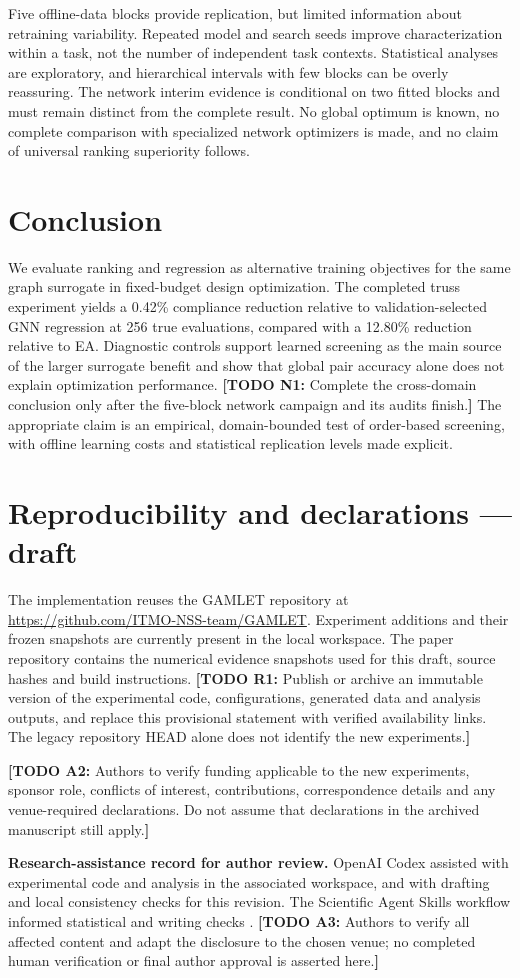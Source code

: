 \documentclass[11pt,a4paper]{article}
\newcommand{\todo}[2]{\textcolor{red!65!black}{\textbf{[TODO #1:} #2\textbf{]}}}
\begin{document}
Five offline-data blocks provide replication, but limited information about retraining variability. Repeated model and search seeds improve characterization within a task, not the number of independent task contexts. Statistical analyses are exploratory, and hierarchical intervals with few blocks can be overly reassuring. The network interim evidence is conditional on two fitted blocks and must remain distinct from the complete result. No global optimum is known, no complete comparison with specialized network optimizers is made, and no claim of universal ranking superiority follows.

\section{Conclusion}
We evaluate ranking and regression as alternative training objectives for the same graph surrogate in fixed-budget design optimization. The completed truss experiment yields a 0.42\% compliance reduction relative to validation-selected GNN regression at 256 true evaluations, compared with a 12.80\% reduction relative to EA. Diagnostic controls support learned screening as the main source of the larger surrogate benefit and show that global pair accuracy alone does not explain optimization performance. \todo{N1}{Complete the cross-domain conclusion only after the five-block network campaign and its audits finish.} The appropriate claim is an empirical, domain-bounded test of order-based screening, with offline learning costs and statistical replication levels made explicit.

\section*{Reproducibility and declarations --- draft}
The implementation reuses the GAMLET repository at \url{https://github.com/ITMO-NSS-team/GAMLET}. Experiment additions and their frozen snapshots are currently present in the local workspace. The paper repository contains the numerical evidence snapshots used for this draft, source hashes and build instructions. \todo{R1}{Publish or archive an immutable version of the experimental code, configurations, generated data and analysis outputs, and replace this provisional statement with verified availability links. The legacy repository HEAD alone does not identify the new experiments.}

\todo{A2}{Authors to verify funding applicable to the new experiments, sponsor role, conflicts of interest, contributions, correspondence details and any venue-required declarations. Do not assume that declarations in the archived manuscript still apply.}

\textbf{Research-assistance record for author review.} OpenAI Codex assisted with experimental code and analysis in the associated workspace, and with drafting and local consistency checks for this revision. The Scientific Agent Skills workflow informed statistical and writing checks \citep{kassis2026}. \todo{A3}{Authors to verify all affected content and adapt the disclosure to the chosen venue; no completed human verification or final author approval is asserted here.}

\begingroup
\raggedright


\endgroup
\end{document}

